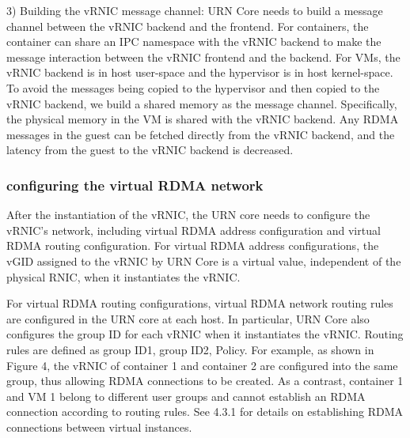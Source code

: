 3) Building the vRNIC message channel: URN Core needs to build a message channel between the vRNIC backend and the frontend. For containers, the container can share an IPC namespace with the vRNIC backend to make the message interaction between the vRNIC frontend and the backend. For VMs, the vRNIC backend is in host user-space and the hypervisor is in host kernel-space. To avoid the messages being copied to the hypervisor and then copied to the vRNIC backend, we build a shared memory as the message channel. Specifically, the physical memory in the VM is shared with the vRNIC backend. Any RDMA messages in the guest can be fetched directly from the vRNIC backend, and the latency from the guest to the vRNIC backend is decreased.


\subsubsection{configuring the virtual RDMA network}

After the instantiation of the vRNIC, the URN core needs to configure the vRNIC's network, including virtual RDMA address configuration and virtual RDMA routing configuration.
For virtual RDMA address configurations, the vGID assigned to the vRNIC by URN Core is a virtual value, independent of the physical RNIC, when it instantiates the vRNIC.

For virtual RDMA routing configurations, virtual RDMA network routing rules are configured in the URN core at each host. In particular, URN Core also configures the group ID for each vRNIC when it instantiates the vRNIC. Routing rules are defined as {group ID1, group ID2, Policy}. For example, as shown in Figure 4, the vRNIC of container 1 and container 2 are configured into the same group, thus allowing RDMA connections to be created. As a contrast, container 1 and VM 1 belong to different user groups and cannot establish an RDMA connection according to routing rules. See 4.3.1 for details on establishing RDMA connections between virtual instances.

